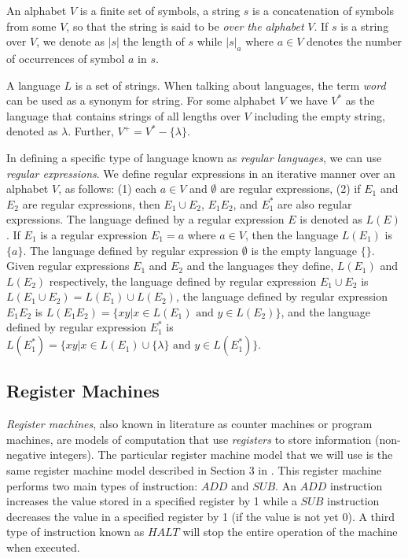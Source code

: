 \documentclass[smallextended]{svjour3}
\begin{document}
An alphabet $V$ is a finite set of symbols, a string $s$ is a concatenation of symbols from some $V$, so that the string is said to be \textit{over
the alphabet} $V$. If $s$ is a string over $V$, we denote as $|s|$ the length of $s$ while $|s|_a$ where $a \in V$ denotes the number of occurrences 
of symbol $a$ in $s$. 
  
A language $L$ is a set of strings. When talking about languages, the term \textit{word} can be
used as a synonym for string. For some alphabet $V$ we have $V^*$ as the language that contains
strings of all lengths over $V$ including the empty string, denoted as $\lambda$. Further, 
$V^+ = V^* - \{\lambda\}$. 

In defining a specific type of language known as \textit{regular languages}, we can use
\textit{regular expressions}. We define regular expressions in an iterative manner over an alphabet
$V$, as follows: (1) each $a \in V$ and $\emptyset$ are regular expressions, (2) if $E_1$ and $E_2$ are regular expressions, then $E_1 \cup E_2$,
$E_1 E_2$, and $E_1^*$ are also regular expressions. The language defined by a regular expression $E$ is denoted as $L(E)$. If $E_1$ is a regular
expression $E_1 = a$ where  $a \in V$, then the language $L(E_1)$ is $\{a\}$. The language defined by regular expression $\emptyset$ is the empty
language $\{\}$. Given regular expressions $E_1$ and $E_2$ and the languages they define, $L(E_1)$ and $L(E_2)$ respectively, the language
defined by regular expression $E_1 \cup E_2$ is  $L(E_1 \cup E_2) =L(E_1) \cup L(E_2)$, the language defined by regular expression $E_1 E_2$
is $L(E_1 E_2) = \{xy|x \in L(E_1) \text{ and } y \in L(E_2) \}$, and the language defined by regular expression $E_1^*$ is $L(E_1^*) = \{xy|
x \in L(E_1) \cup \{\lambda\} \text{ and } y \in L(E_1^*)\}$. 


\subsection{Register Machines}\label{sec-register}

\textit{Register machines}, also known in literature as counter machines or program machines, are models of computation that use \textit{registers} to
store information (non-negative integers). The particular register machine model that we will use is the same register machine model described in 
Section 3 in \cite{ionescu-2006-snp}. This register machine performs two main types of instruction: $ADD$ and $SUB$. An $ADD$ instruction increases the value 
stored in a specified register by 1 while a $SUB$ instruction decreases the value in a specified register by 1 (if the value is not yet 0). A third 
type of  instruction known as $HALT$ will stop the entire operation of the machine when executed.
    
\end{document}
